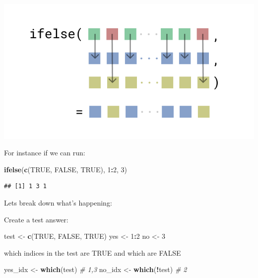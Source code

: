 \documentclass[]{book}
\newenvironment{Shaded}{\begin{snugshade}}{\end{snugshade}}
\newcommand{\CommentTok}[1]{\textcolor[rgb]{0.56,0.35,0.01}{\textit{#1}}}
\newcommand{\DecValTok}[1]{\textcolor[rgb]{0.00,0.00,0.81}{#1}}
\newcommand{\KeywordTok}[1]{\textcolor[rgb]{0.13,0.29,0.53}{\textbf{#1}}}
\newcommand{\NormalTok}[1]{#1}
\newcommand{\OperatorTok}[1]{\textcolor[rgb]{0.81,0.36,0.00}{\textbf{#1}}}
\newcommand{\OtherTok}[1]{\textcolor[rgb]{0.56,0.35,0.01}{#1}}
\newcommand{\StringTok}[1]{\textcolor[rgb]{0.31,0.60,0.02}{#1}}
\begin{document}
\begin{center}\includegraphics[width=9.76in]{images/ifelse} \end{center}

For instance if we can run:

\begin{Shaded}
\begin{Highlighting}[]
\KeywordTok{ifelse}\NormalTok{(}\KeywordTok{c}\NormalTok{(}\OtherTok{TRUE}\NormalTok{, }\OtherTok{FALSE}\NormalTok{, }\OtherTok{TRUE}\NormalTok{), }\DecValTok{1}\OperatorTok{:}\DecValTok{2}\NormalTok{, }\DecValTok{3}\NormalTok{)}
\end{Highlighting}
\end{Shaded}

\begin{verbatim}
## [1] 1 3 1
\end{verbatim}

Lets break down what's happening:

Create a test answer:

\begin{Shaded}
\begin{Highlighting}[]
\NormalTok{test <-}\StringTok{ }\KeywordTok{c}\NormalTok{(}\OtherTok{TRUE}\NormalTok{, }\OtherTok{FALSE}\NormalTok{, }\OtherTok{TRUE}\NormalTok{)}
\NormalTok{yes <-}\StringTok{ }\DecValTok{1}\OperatorTok{:}\DecValTok{2}
\NormalTok{no <-}\StringTok{ }\DecValTok{3}
\end{Highlighting}
\end{Shaded}

which indices in the test are TRUE and which are FALSE

\begin{Shaded}
\begin{Highlighting}[]
\NormalTok{yes_idx <-}\StringTok{ }\KeywordTok{which}\NormalTok{(test) }\CommentTok{# 1,3}
\NormalTok{no_idx <-}\StringTok{ }\KeywordTok{which}\NormalTok{(}\OperatorTok{!}\NormalTok{test) }\CommentTok{# 2}
\end{Highlighting}
\end{Shaded}
\end{document}
